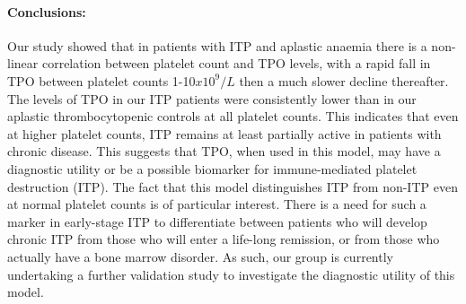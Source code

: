 \documentclass[11pt]{article}
\begin{document}
\paragraph{Conclusions:} Our study showed that in patients with ITP and aplastic anaemia there is a non-linear correlation between platelet count and TPO levels, with a rapid fall in TPO between platelet counts 1-10$x10^9/L$ then a much slower decline thereafter. The levels of TPO in our ITP patients were consistently lower than in our aplastic thrombocytopenic controls at all platelet counts. This indicates that even at higher platelet counts, ITP remains at least partially active in patients with chronic disease. This suggests that TPO, when used in this model, may have a diagnostic utility or be a possible biomarker for immune-mediated platelet destruction (ITP). The fact that this model distinguishes ITP from non-ITP even at normal platelet counts is of particular interest. There is a need for such a marker in early-stage ITP to differentiate between patients who will develop chronic ITP from those who will enter a life-long remission, or from those who actually have a bone marrow disorder. As such, our group is currently undertaking a further validation study to investigate the diagnostic utility of this model.



\end{document}
